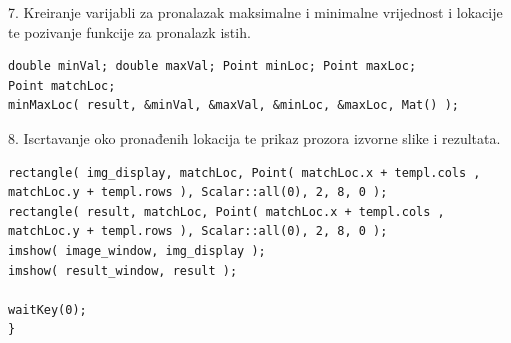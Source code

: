 7. Kreiranje varijabli za pronalazak maksimalne i minimalne vrijednost i
lokacije te pozivanje funkcije za pronalazk istih.
\begin{lstlisting}[caption={}]
double minVal; double maxVal; Point minLoc; Point maxLoc;
Point matchLoc;
minMaxLoc( result, &minVal, &maxVal, &minLoc, &maxLoc, Mat() );
\end{lstlisting}

8. Iscrtavanje oko pronađenih lokacija te prikaz prozora izvorne slike i
rezultata.
\begin{lstlisting}[caption={}]
rectangle( img_display, matchLoc, Point( matchLoc.x + templ.cols , matchLoc.y + templ.rows ), Scalar::all(0), 2, 8, 0 );
rectangle( result, matchLoc, Point( matchLoc.x + templ.cols , matchLoc.y + templ.rows ), Scalar::all(0), 2, 8, 0 );
imshow( image_window, img_display );
imshow( result_window, result );

waitKey(0);
}
\end{lstlisting}


